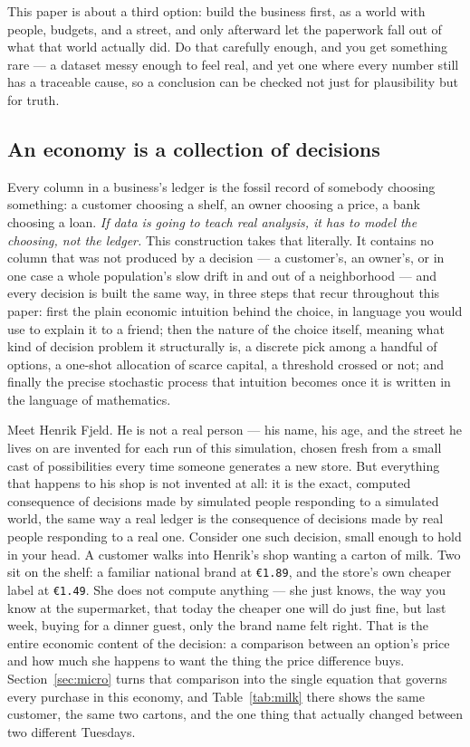 \documentclass[12pt,a4paper]{article}
\begin{document}
This paper is about a third option: build the business first, as a world
with people, budgets, and a street, and only afterward let the paperwork
fall out of what that world actually did. Do that carefully enough, and
you get something rare --- a dataset messy enough to feel real, and yet
one where every number still has a traceable cause, so a conclusion can
be checked not just for plausibility but for truth.

\subsection{An economy is a collection of decisions}

Every column in a business's ledger is the fossil record of somebody
choosing something: a customer choosing a shelf, an owner choosing a
price, a bank choosing a loan. \emph{If data is going to teach real
analysis, it has to model the choosing, not the ledger.} This construction
takes that literally. It contains no column that was not produced by a
decision --- a customer's, an owner's, or in one case a whole population's
slow drift in and out of a neighborhood --- and every decision is built
the same way, in three steps that recur throughout this paper: first the
plain economic intuition behind the choice, in language you would use to
explain it to a friend; then the nature of the choice itself, meaning what
kind of decision problem it structurally is, a discrete pick among a
handful of options, a one-shot allocation of scarce capital, a threshold
crossed or not; and finally the precise stochastic process that
intuition becomes once it is written in the language of mathematics.

Meet Henrik Fjeld. He is not a real person --- his name, his age, and the
street he lives on are invented for each run of this simulation, chosen
fresh from a small cast of possibilities every time someone generates a
new store. But everything that happens to his shop is not invented at
all: it is the exact, computed consequence of decisions made by
simulated people responding to a simulated world, the same way a real
ledger is the consequence of decisions made by real people responding to
a real one. Consider one such decision, small enough to hold in your
head. A customer walks into Henrik's shop wanting a carton of milk. Two
sit on the shelf: a familiar national brand at \texttt{\euro{}1.89}, and
the store's own cheaper label at \texttt{\euro{}1.49}. She does not
compute anything --- she just knows, the way you know at the supermarket,
that today the cheaper one will do just fine, but last week, buying for a
dinner guest, only the brand name felt right. That is the entire
economic content of the decision: a comparison between an option's price
and how much she happens to want the thing the price difference buys.
Section~\ref{sec:micro} turns that comparison into the single equation
that governs every purchase in this economy, and Table~\ref{tab:milk}
there shows the same customer, the same two cartons, and the one thing
that actually changed between two different Tuesdays.
\end{document}
